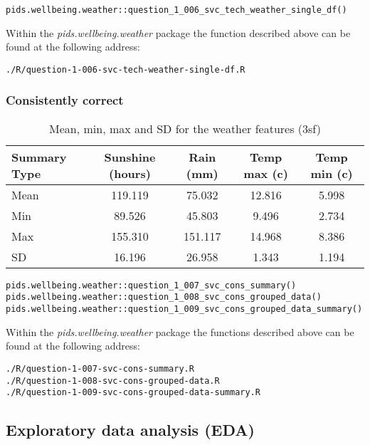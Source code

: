 \documentclass[12pt, oneside, openany]{book}
\begin{document}
\begin{verbatim}
pids.wellbeing.weather::question_1_006_svc_tech_weather_single_df()
\end{verbatim}

Within the \emph{pids.wellbeing.weather} package the function described above can be found at the following address:

\begin{verbatim}
./R/question-1-006-svc-tech-weather-single-df.R
\end{verbatim}

\subsubsection*{Consistently correct}

\begin{table}[h!]
	\centering
	\begin{tabular}{ |l|c|c|c|c| }
		\hline
		Summary Type & Sunshine (hours) & Rain (mm) & Temp max (c) & Temp min (c)\\
		\hline
		\hline
		Mean & 119.119  & 75.032  & 12.816 & 5.998 \\
		Min & 89.526  & 45.803  & 9.496   & 2.734 \\
		Max & 155.310 & 151.117  & 14.968  & 8.386 \\
		SD & 16.196  & 26.958   & 1.343  & 1.194 \\
		\hline
	\end{tabular}
	\caption{Mean, min, max and SD for the weather features (3sf)}
	\label{table:question_1_008_grouped_data_summary_non_scaled}
\end{table}

\begin{verbatim}
pids.wellbeing.weather::question_1_007_svc_cons_summary()
pids.wellbeing.weather::question_1_008_svc_cons_grouped_data()
pids.wellbeing.weather::question_1_009_svc_cons_grouped_data_summary()
\end{verbatim}

Within the \emph{pids.wellbeing.weather} package the functions described above can be found at the following address:

\begin{verbatim}
./R/question-1-007-svc-cons-summary.R
./R/question-1-008-svc-cons-grouped-data.R
./R/question-1-009-svc-cons-grouped-data-summary.R
\end{verbatim}

\subsection*{Exploratory data analysis (EDA)}
\end{document}
